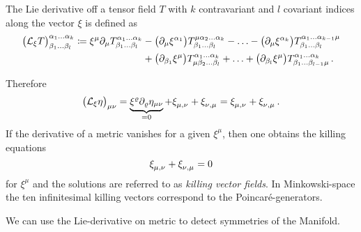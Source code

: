 \begin{definition}
    The Lie derivative off a tensor field $T$ with $k$ contravariant and $l$
    covariant indices along the vector $\xi$ is defined as
    \begin{equation}
        \begin{split}
            \left( \liedif{\xi}{T} \right)^{\alpha_1\ldots\alpha_k}_{\beta_1\ldots\beta_l}
            \coloneqq \xi^\mu \partial_\mu T^{\alpha_1\ldots\alpha_k}_{\beta_1\ldots\beta_l}
            & - \left( \partial_\mu \xi^{\alpha_1} \right) T^{\mu\alpha_2\ldots\alpha_k}_{\beta_1\ldots\beta_l} - \ldots
            - \left( \partial_\mu \xi^{\alpha_k} \right) T^{\alpha_1\ldots\alpha_{k-1}\mu}_{\beta_1\ldots\beta_l} \\
            & + \left( \partial_{\beta_1} \xi^\mu \right) T^{\alpha_1\ldots\alpha_k}_{\mu\beta_2\ldots\beta_l} + \ldots
            +  \left( \partial_{\beta_l} \xi^\mu \right)
            T^{\alpha_1\ldots\alpha_k}_{\beta_1\ldots\beta_{l-1}\mu}\,.
        \end{split}
    \end{equation}
\end{definition}
Therefore
\begin{equation}
    \left( \liedif{\xi}{\eta} \right)_{\mu\nu} = \underbrace{\xi^\varrho\partial_\varrho\eta_{\mu\nu}}_{=0}
    + \tensor{\xi}{_\mu_,_\nu} + \tensor{\xi}{_\nu_,_\mu} =
    \tensor{\xi}{_\mu_,_\nu} + \tensor{\xi}{_\nu_,_\mu}\,.
\end{equation}
If the derivative of a metric vanishes for a given $\xi^\mu$, then one obtains
the killing equations 
\begin{equation}
    \tensor{\xi}{_\mu_,_\nu} + \tensor{\xi}{_\nu_,_\mu}=0 
\end{equation}
for $\xi^\mu$ and the solutions are referred to as \emph{killing vector fields}.
In Minkowski-space the ten infinitesimal killing vectors correspond to the Poincaré-generators.
\begin{sidenote}
We can use the Lie-derivative on metric to detect symmetries of the Manifold.
\end{sidenote}
